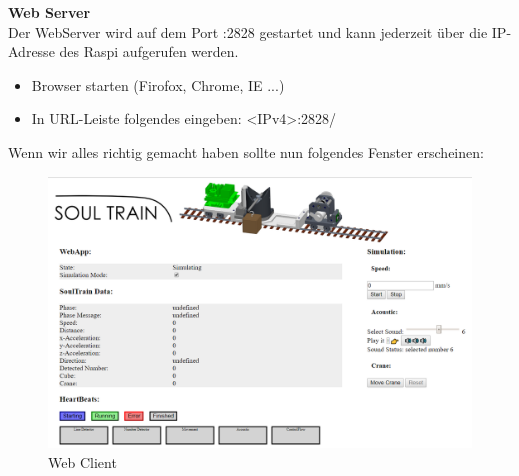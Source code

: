 \documentclass[../../main.tex]{subfiles}
\begin{document}
\textbf{Web Server}\\
Der WebServer wird auf dem Port :2828 gestartet und kann jederzeit über die IP-Adresse des Raspi aufgerufen werden.
\begin{itemize}
    \item Browser starten (Firofox, Chrome, IE ...)
    \item In URL-Leiste folgendes eingeben: <IPv4>:2828/
\end{itemize}

Wenn wir alles richtig gemacht haben sollte nun folgendes Fenster erscheinen:
\begin{figure}[H] \centering
    \includegraphics[width=1\textwidth]{HomeWebApp}
    \caption{Web Client}
    \label{fig:Home}
\end{figure}
\end{document}
